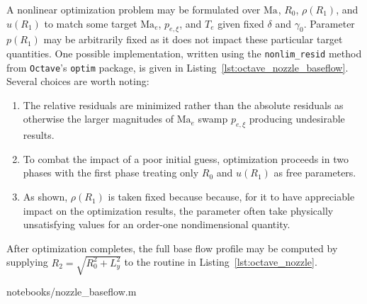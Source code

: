 \documentclass[letterpaper,11pt,nointlimits,reqno]{amsart}
\newcommand{\Mach}[1][]{\ensuremath{\mbox{Ma}_{#1}}}
\begin{document}
A nonlinear optimization problem may be formulated over $\Mach$, $R_0$,
$\rho\!\left(R_1\right)$, and $u\!\left(R_1\right)$ to match some target
$\Mach[e]{}$, $p_{e,\xi}$, and $T_e$ given fixed $\delta$ and $\gamma_0$.
Parameter $p\!\left(R_1\right)$ may be arbitrarily fixed as it does not impact
these particular target quantities.  One possible implementation, written using
the \texttt{nonlim\_resid} method from \texttt{Octave}'s \texttt{optim}
package, is given in Listing~\ref{lst:octave_nozzle_baseflow}.  Several choices
are worth noting:
\begin{enumerate}
  \item The relative residuals are minimized rather than the absolute residuals
    as otherwise the larger magnitudes of $\Mach[e]{}$ swamp $p_{e,\xi}$
    producing undesirable results.
  \item To combat the impact of a poor initial guess, optimization proceeds in
    two phases with the first phase treating only $R_0$ and
    $u\!\left(R_1\right)$ as free parameters.
  \item As shown, $\rho\!\left(R_1\right)$ is taken fixed because because, for
    it to have appreciable impact on the optimization results, the parameter
    often take physically unsatisfying values for an order-one nondimensional
    quantity.
\end{enumerate}
After optimization completes, the full base flow profile may be computed by
supplying $R_2 = \sqrt{R_0^2 + L_y^2}$ to the routine in
Listing~\ref{lst:octave_nozzle}.


                {notebooks/nozzle_baseflow.m}

\newcommand*{\doi}[1]{\href{http://dx.doi.org/\detokenize{#1}}{doi: #1}}


\end{document}
